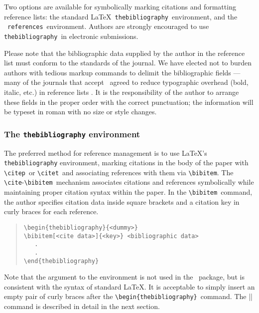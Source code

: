\documentclass[preprint2]{aastex}
\begin{document}
Two options are available for symbolically marking citations 
and formatting reference lists: the standard \LaTeX\ \verb"thebibliography"\ 
environment, and the \aastex\ \verb"references"\  environment. 
Authors are strongly encouraged to use \verb"thebibliography"\ 
in electronic submissions. 
 
Please note that the bibliographic data supplied by the author in 
the reference list must conform to the standards of the journal. 
We have elected not to burden authors with tedious markup commands 
to delimit the bibliographic fields --- many of the journals that 
accept \aastex\ agreed to reduce typographic overhead 
(bold, italic, etc.) in reference lists \citep{Abt90}. 
It is the responsibility of the author to arrange these fields in the 
proper order with the correct punctuation; the information will be 
typeset in roman with no size or style changes. 
 
 
\subsubsection{The {\tt thebibliography} environment}   \label{bib} 
 
The preferred method for reference management is to use \LaTeX's 
\texttt{thebibliography} environment, marking citations in the body 
of the paper with 
\verb"\citep"\ or \verb"\citet"\ 
and associating references with them via \verb"\bibitem". 
The \verb"\cite"-\verb"\bibitem"\ 
mechanism associates citations and references symbolically 
while maintaining proper citation syntax within the paper. 
In the \verb"\bibitem"\ 
command, the author specifies citation data inside 
square brackets and a citation key in curly braces 
for each reference. 
\begin{quote} 
\begin{verbatim} 
\begin{thebibliography}{<dummy>} 
\bibitem[<cite data>]{<key>} <bibliographic data> 
   . 
   . 
\end{thebibliography} 
\end{verbatim} 
\end{quote} 
 
Note that the argument  to the environment is not 
used in the \aastex\ package, but is consistent with the 
syntax of standard \LaTeX. It is acceptable to simply insert an 
empty pair of curly braces after the \verb"\begin{thebibliography}"\ 
command. 
The |\bibitem| command is described in detail in the next section. 
 
\end{document}
